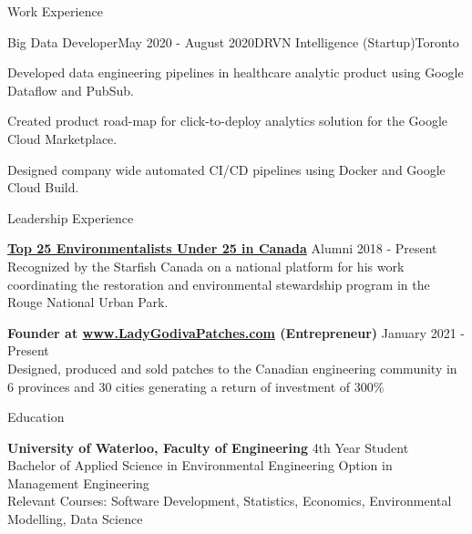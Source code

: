 \documentclass{resume} %
\begin{document}
\begin{rSection}{Work Experience}


\begin{rSubsection}{Big Data Developer}{May 2020 - August 2020}{DRVN Intelligence (Startup)}{Toronto}
\item Developed data engineering pipelines in healthcare analytic product using Google Dataflow and PubSub.
\item Created product road-map for click-to-deploy analytics solution for the Google Cloud Marketplace.
\item Designed company wide automated CI/CD pipelines using Docker and Google Cloud Build.

\end{rSubsection}


\end{rSection}


\begin{rSection}{Leadership Experience}

{\bf \href{https://thestarfish.ca/journal/2018/06/2018-sftop25-finalist-sujeethan-vigneswaran-2}{Top 25 Environmentalists Under 25 in Canada}  } \hfill {Alumni 2018 - Present}\\
Recognized by the Starfish Canada on a national platform for his work coordinating the restoration and environmental stewardship program in the Rouge National Urban Park.

{\bf Founder at \href{www.ladygodivapatches.com}{www.LadyGodivaPatches.com} (Entrepreneur) } \hfill {January 2021 - Present} \\ 
Designed, produced and sold patches to the Canadian engineering community in 6 provinces and 30 cities generating a return of investment of 300\%

\end{rSection}

\begin{rSection}{Education}

{\bf University of Waterloo, Faculty of Engineering} \hfill { 4th Year Student } \\ 
Bachelor of Applied Science in Environmental Engineering Option in Management Engineering \\
Relevant Courses: Software Development, Statistics, Economics, Environmental Modelling, Data Science

\end{rSection}
\end{document}
